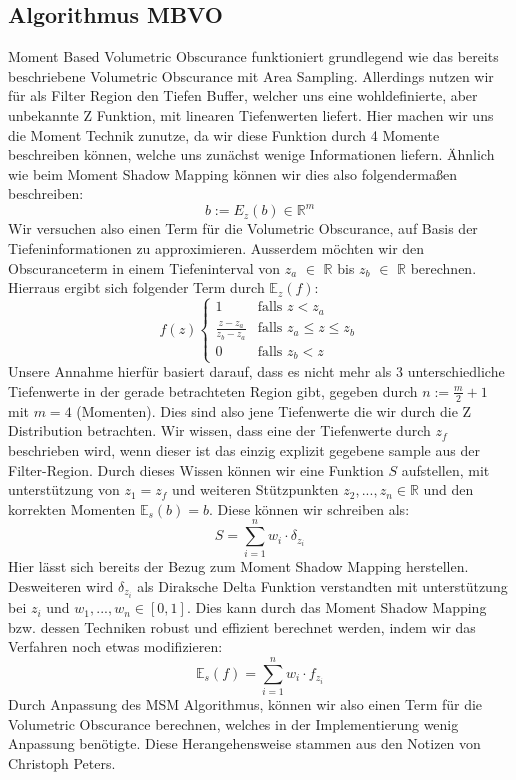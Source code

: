 \documentclass[runningheaders,a4paper]{llncs}
\begin{document}
\subsection{Algorithmus MBVO}
Moment Based Volumetric Obscurance funktioniert grundlegend wie das bereits beschriebene Volumetric Obscurance mit Area Sampling. Allerdings nutzen wir für als Filter Region den Tiefen Buffer, welcher uns eine wohldefinierte, aber unbekannte Z Funktion, mit linearen Tiefenwerten liefert. Hier machen wir uns die Moment Technik zunutze, da wir diese Funktion durch 4 Momente beschreiben können, welche uns zunächst wenige Informationen liefern. Ähnlich wie beim Moment Shadow Mapping können wir dies also folgendermaßen beschreiben:
$$ b := E_z(b) \in \mathbb{R}^m $$
Wir versuchen also einen Term für die Volumetric Obscurance, auf Basis der Tiefeninformationen zu approximieren. Ausserdem möchten wir den Obscuranceterm in einem Tiefeninterval von $z_a$ $\in$ $\mathbb{R}$ bis $z_b$ $\in$ $\mathbb{R}$ berechnen.
Hierraus ergibt sich folgender Term durch $\mathbb{E}_z(f)$: 
$$ f(z)
\begin{cases}
\phantom{} 1 & \text{falls } z < z_a\\ 
\frac{z-z_a}{z_b-z_a} & \text{falls } z_a \leq z \leq z_b\\
0 & \text{falls } z_b < z
\end{cases}
$$
Unsere Annahme hierfür basiert darauf, dass es nicht mehr als 3 unterschiedliche Tiefenwerte in der gerade betrachteten Region gibt, gegeben durch $n:=\frac{m}{2}+1$ mit $m=4$ (Momenten). Dies sind also jene Tiefenwerte die wir durch die Z Distribution betrachten. Wir wissen, dass eine der Tiefenwerte durch $z_f$ beschrieben wird, wenn dieser ist das einzig explizit gegebene sample aus der Filter-Region. Durch dieses Wissen können wir eine Funktion $S$ aufstellen, mit unterstützung von $z_1=z_f$ und weiteren Stützpunkten $z_2,...,z_n \in \mathbb{R}$  und den korrekten Momenten $\mathbb{E}_s(b)=b$. Diese können wir schreiben als:
$$ 
S = \sum_{i=1}^{n} w_i \cdot \delta_{z_i} 
$$
Hier lässt sich bereits der Bezug zum Moment Shadow Mapping herstellen. Desweiteren wird $\delta_{z_i}$ als Diraksche Delta Funktion verstandten mit unterstützung bei $z_i$ und $w_1,...,w_n \in [0,1]$.
Dies kann durch das Moment Shadow Mapping bzw. dessen Techniken robust und effizient berechnet werden, indem wir das Verfahren noch etwas modifizieren:
$$ 
\mathbb{E}_s(f) = \sum_{i=1}^{n} w_i \cdot f_{z_i} 
$$
Durch Anpassung des MSM Algorithmus, können wir also einen Term für die Volumetric Obscurance berechnen, welches in der Implementierung wenig Anpassung benötigte.
Diese Herangehensweise stammen aus den Notizen von Christoph Peters\cite{mbvo}.
\end{document}
